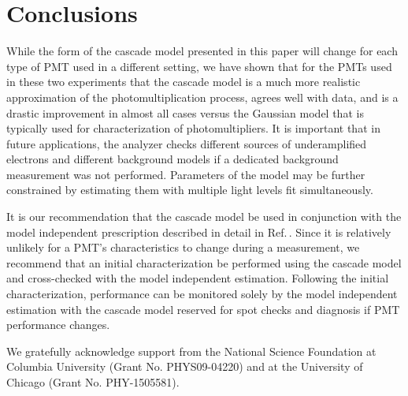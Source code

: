 \documentclass[11pt,a4paper]{article}
\newcommand\citeref[1]{Ref.\,\cite{#1}}
\begin{document}
\section{\label{sec:level4}Conclusions}


While the form of the cascade model presented in this paper will change for each type of PMT used in a different setting, we have shown that for the PMTs used in these two experiments that the cascade model is a much more realistic approximation of the photomultiplication process, agrees well with data, and is a drastic improvement in almost all cases versus the Gaussian model that is typically used for characterization of photomultipliers.  It is important that in future applications, the analyzer checks different sources of underamplified electrons and different background models if a dedicated background measurement was not performed.  Parameters of the model may be further constrained by estimating them with multiple light levels fit simultaneously.

It is our recommendation that the cascade model be used in conjunction with the model independent prescription described in detail in \citeref{saldanha}.  Since it is relatively unlikely for a PMT's characteristics to change during a measurement, we recommend that an initial characterization be performed using the cascade model and cross-checked with the model independent estimation.  Following the initial characterization, performance can be monitored solely by the model independent estimation with the cascade model reserved for spot checks and diagnosis if PMT performance changes.


\acknowledgments

We gratefully acknowledge support from the National Science Foundation at Columbia University (Grant No. PHYS09-04220) and at the University of Chicago (Grant No. PHY-1505581).
\end{document}
